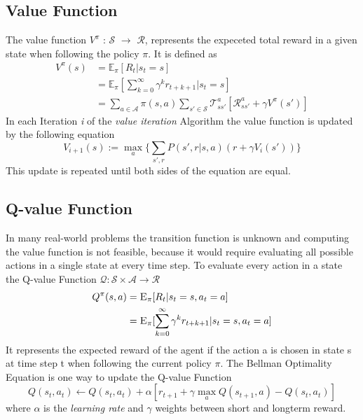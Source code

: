 \subsection{Value Function}
The value function $V^{\pi}$ : $\mathcal{S}$ $\rightarrow$ $\mathcal{R}$, represents the expeceted total reward in a given state when following the policy $\pi$.
It is defined as
 \begin{equation}
  \begin{aligned}
    V^{\pi}(s) &= \mathbb{E}_{\pi} [R_t | s_t = s] \\
    &= \mathbb{E}_{\pi} [\sum^{\infty}_{k=0} \gamma^{k} r_{t+k+1} | s_t = s] \label{MDP:eq1} \\
    &= \sum_{a \in \mathcal{A}} \pi(s, a) \sum_{s' \in \mathcal{S}} \mathcal{T}^{a}_{ss'}[\mathcal{R}^{a}_{ss'} + \gamma V^\pi(s')]
  \end{aligned}
\end{equation}
In each Iteration \textit{i} of the \textit{value iteration} Algorithm the value function is updated by the following equation
\begin{equation}
  V_{i+1}(s) := \max_a \Big\{ \sum_{s', r} P(s',r| s,a) (r + \gamma V_i(s')) \Big\}
\end{equation}
This update is repeated until both sides of the equation are equal.
\subsection{Q-value Function}
In many real-world problems the transition function is unknown and computing the value function is not feasible, because
it would require evaluating all possible actions in a single state at every time step.
To evaluate every action in a state the Q-value Function $ \mathcal{Q}: \mathcal{S} \times \mathcal{A} \rightarrow \mathcal{R} $
\begin{align}
  Q^{\pi}(s, a) &= \textsc{E}_\pi[R_t | s_t = s, a_t = a]  \label{Q:eq1}\\
  &= \textsc{E}_\pi [\sum^\infty_{k=0} \gamma^k r_{t+k+1} | s_t = s, a_t = a]
\end{align}
It represents the expected reward of the agent if the action a is chosen in state s at time step t when following the current policy $\pi$.
The Bellman Optimality Equation is one way to update the Q-value Function 
\begin{equation}
  Q(s_t, a_t) \leftarrow Q(s_t, a_t) + \alpha[r_{t+1} + \gamma \max_a Q(s_{t+1}, a) - Q(s_t, a_t)]
\end{equation}
where $ \alpha$ is the \textit{learning rate} and $\gamma$ weights between short and longterm reward.

